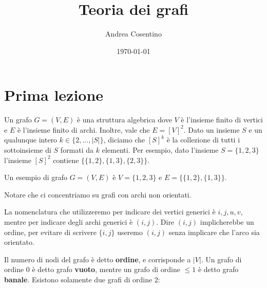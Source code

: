 \documentclass[12pt]{report}
\title{Teoria dei grafi}
\author{Andrea Cosentino}
\date{\today}
\begin{document}
\maketitle

\tableofcontents
\setlength{\columnsep}{0.8cm}
\setlength{\columnseprule}{0.2pt}
\twocolumn

\chapter{Prima lezione}
\noindent
Un grafo $G = (V,E)$ è una struttura algebrica dove $V$ è l'insieme finito di vertici e $E$ è l'insieme finito di archi. Inoltre, vale che $E = [V]^2$. Dato un insieme $S$ e un qualunque intero $k \in \{2,\dots,|S|\}$, diciamo che $[S]^k$ è la collezione di tutti i sottoinsieme di $S$ formati da $k$ elementi. Per esempio, dato l'insieme $S = \{1,2,3\}$ l'insieme $[S]^2$ contiene $\{\{1,2\}, \{1,3\},\{2,3\}\}$. 

\begin{exmp}
    Un esempio di grafo $G = (V,E)$ è $V = \{1,2,3\}$ e $E = \{\{1,2\},\{1,3\}\}$.
    
\vspace{10px}
\begin{center}
\end{center}
\end{exmp}

\noindent
Notare che ci concentriamo su grafi con archi non orientati.

La nomenclatura che utilizzeremo per indicare dei vertici generici è $i,j,u,v$, mentre per indicare degli archi generici è $(i,j)$. Dire $(i,j)$ implicherebbe un ordine, per evitare di scrivere $\{i,j\}$ useremo $(i,j)$ senza implicare che l'arco sia orientato.

Il numero di nodi del grafo è detto \textbf{ordine}, e corrisponde a $|V|$. Un grafo di ordine $0$ è detto grafo \textbf{vuoto}, mentre un grafo di ordine $\leq 1$ è detto grafo \textbf{banale}. Esistono solamente due grafi di ordine $2$:

\end{document}
